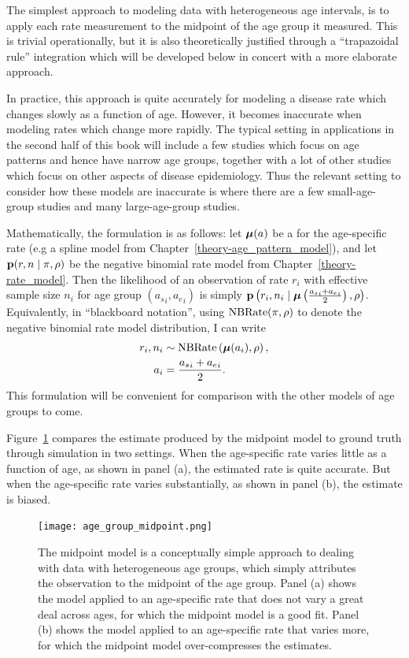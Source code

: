 The simplest approach to modeling data with heterogeneous age
intervals, is to apply each rate measurement to the midpoint of the
age group it measured.  This is trivial operationally, but it is also
theoretically justified through a ``trapazoidal rule'' integration
which will be developed below in concert with a more elaborate
approach.

In practice, this approach is quite accurately for modeling a
disease rate which changes slowly as a function of age.  However, it
becomes inaccurate when modeling rates which change more
rapidly.  The typical setting in applications in the second half of
this book will include a few studies which focus on age patterns and
hence have narrow age groups, together with a lot of other studies
which focus on other aspects of disease epidemiology.  Thus the
relevant setting to consider how these models are inaccurate is where
there are a few small-age-group studies and many large-age-group
studies.

Mathematically, the formulation is as follows: let $\boldsymbol{\mu}(a)$ be a
for the age-specific rate (e.g a spline model from
Chapter~\ref{theory-age_pattern_model}), and let $\mathbf{p}(r,n\;|\; \pi,
\rho)$ be the negative binomial rate model from
Chapter~\ref{theory-rate_model}.  Then the likelihood of an
observation of rate $r_i$ with effective sample size $n_i$ for age
group $({a_s}_i, {a_e}_i)$ is simply $\mathbf{p}\left(r_i, n_i \;|\;
\boldsymbol{\mu}\left(\frac{{a_s}_i+{a_e}_i}{2}\right),
\rho\right)$. Equivalently, in ``blackboard notation'', using
$\operatorname{NBRate}(\pi, \rho)$ to denote the negative binomial rate model
distribution, I can write
\begin{align*}
r_i, n_i &\sim \operatorname{NBRate}\left(\boldsymbol{\mu}(a_i), \rho\right),\\
a_i &= \frac{{a_s}_i+{a_e}_i}{2}.
\end{align*}
This formulation will be convenient for comparison with the other models of age groups to come.

Figure~\ref{midpoint} compares the estimate produced by the midpoint
model to ground truth through simulation in two settings.  When the
age-specific rate varies little as a function of age, as shown in
panel (a), the estimated rate is quite accurate.  But when the
age-specific rate varies substantially, as shown in panel (b), the
estimate is biased.


\begin{figure}[h]
\begin{center}
\texttt{[image: age\_group\_midpoint.png]}
\caption{The midpoint model is a conceptually simple approach to
  dealing with data with heterogeneous age groups, which simply
  attributes the observation to the midpoint of the age group.  Panel
  (a) shows the model applied to an age-specific rate that does not
  vary a great deal across ages, for which the midpoint model is a
  good fit.  Panel (b) shows the model applied to an age-specific rate
  that varies more, for which the midpoint model over-compresses the
  estimates.}
\label{midpoint}
\end{center}
\end{figure}


